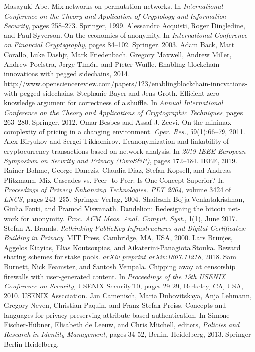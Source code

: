 \documentclass{article}
\begin{document}
\small
\begin{thebibliography}{200} 
Masayuki Abe. Mix-networks on permutation networks. In \emph{International Conference on the Theory and Application of Cryptology and Information Security}, pages 258–273. Springer, 1999.
Alessandro Acquisti, Roger Dingledine, and Paul Syverson. On the economics of anonymity. In \emph{International Conference on Financial Cryptography}, pages 84–102. Springer, 2003.
Adam Back, Matt Corallo, Luke Dashjr, Mark Friedenbach, Gregory Maxwell, Andrew Miller, Andrew Poelstra, Jorge Timón, and Pieter Wuille. Enabling blockchain innovations with pegged sidechains, 2014. http://www.opensciencereview.com/papers/123/enablingblockchain-innovations-with-pegged-sidechains.
Stephanie Bayer and Jens Groth. Efficient zero-knowledge argument for correctness of a shuffle. In \emph{Annual International Conference on the Theory and Applications of Cryptographic Techniques}, pages 263–280. Springer, 2012.
Omar Besbes and Assaf J. Zeevi. On the minimax complexity of pricing in a changing environment. \emph{Oper. Res.}, 59(1):66–79, 2011.
Alex Biryukov and Sergei Tikhomirov. Deanonymization and linkability of cryptocurrency transactions based on network analysis. In \emph{2019 IEEE European Symposium on Security and Privacy (EuroS\&P)}, pages 172–184. IEEE, 2019.
Rainer Bohme, George Danezis, Claudia Diaz, Stefan Kopsell, and Andreas Pfitzmann. Mix Cascades vs. Peer- to-Peer: Is One Concept Superior? In \emph{Proceedings of Privacy Enhancing Technologies, PET 2004}, volume 3424 of \emph{LNCS}, pages 243–255. Springer-Verlag, 2004.
Shaileshh Bojja Venkatakrishnan, Giulia Fanti, and Pramod Viswanath. Dandelion: Redesigning the bitcoin net- work for anonymity. \emph{Proc. ACM Meas. Anal. Comput. Syst.}, 1(1), June 2017.
Stefan A. Brands. \emph{Rethinking PublicKey Infrastructures and Digital Certificates: Building in Privacy}. MIT Press, Cambridge, MA, USA, 2000.
Lars Brünjes, Aggelos Kiayias, Elias Koutsoupias, and Aikaterini-Panagiota Stouka. Reward sharing schemes for stake pools. \emph{arXiv preprint arXiv:1807.11218}, 2018.
Sam Burnett, Nick Feamster, and Santosh Vempala. Chipping away at censorship firewalls with user-generated content. In \emph{Proceedings of the 19th USENIX Conference on Security}, USENIX Security'10, pages 29-29, Berkeley, CA, USA, 2010. USENIX Association.
Jan Camenisch, Maria Dubovitskaya, Anja Lehmann, Gregory Neven, Christian Paquin, and Franz-Stefan Preiss. Concepts and languages for privacy-preserving attribute-based authentication. In Simone Fischer-Hübner, Elisabeth de Leeuw, and Chris Mitchell, editors, \emph{Policies and Research in Identity Management}, pages 34-52, Berlin, Heidelberg, 2013. Springer Berlin Heidelberg.

\end{thebibliography}
\end{document}
